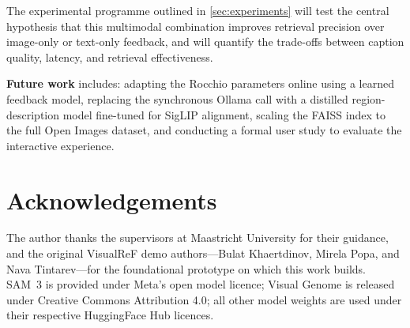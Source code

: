 \documentclass[12pt,a4paper]{article}
\begin{document}
The experimental programme outlined in \cref{sec:experiments} will test the
central hypothesis that this multimodal combination improves retrieval
precision over image-only or text-only feedback, and will quantify the
trade-offs between caption quality, latency, and retrieval effectiveness.

\textbf{Future work} includes: adapting the Rocchio parameters online using a
learned feedback model, replacing the synchronous Ollama call with a
distilled region-description model fine-tuned for SigLIP alignment, scaling
the FAISS index to the full Open Images dataset, and conducting a formal
user study to evaluate the interactive experience.

\section*{Acknowledgements}

The author thanks the supervisors at Maastricht University for their guidance,
and the original VisualReF demo authors—Bulat Khaertdinov, Mirela Popa, and
Nava Tintarev—for the foundational prototype on which this work builds.
SAM~3 is provided under Meta's open model licence; Visual Genome is released
under Creative Commons Attribution 4.0; all other model weights are used under
their respective HuggingFace Hub licences.
\end{document}
